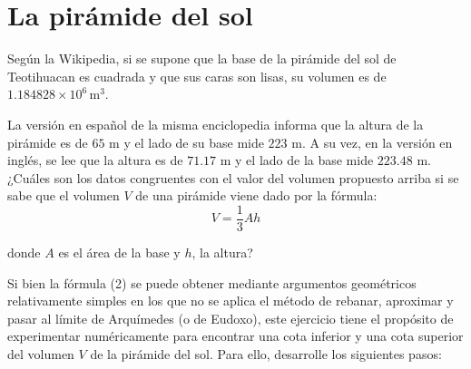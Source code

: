 \documentclass[12pt]{article}
\begin{document}
\section{\large La pirámide del sol}

Según la Wikipedia, si se supone que la base de la pirámide del sol de Teotihuacan es cuadrada y que sus caras son lisas, su volumen es de $1.184828 \times 10^6 \, \text{m}^3$.

La versión en español de la misma enciclopedia informa que la altura de la pirámide es de $65$ m y el lado de su base mide $223$ m. A su vez, en la versión en inglés, se lee que la altura es de $71.17$ m y el lado de la base mide $223.48$ m. ¿Cuáles son los datos congruentes con el valor del volumen propuesto arriba si se sabe que el volumen $V$ de una pirámide viene dado por la fórmula:
    \[V = \frac{1}{3} A h \tag{2}\]

    donde $A$ es el área de la base y $h$, la altura?

    Si bien la fórmula (2) se puede obtener mediante argumentos geométricos relativamente simples en los que no se aplica el método de rebanar, aproximar y pasar al límite de Arquímedes (o de Eudoxo), este ejercicio tiene el propósito de experimentar numéricamente para encontrar una cota inferior y una cota superior del volumen $V$ de la pirámide del sol. Para ello, desarrolle los siguientes pasos:
\end{document}

